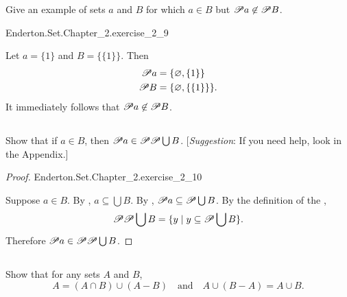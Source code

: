 \documentclass{report}
\begin{document}
Give an example of sets $a$ and $B$ for which $a \in B$ but
  $\mathscr{P}a \not\in \mathscr{P}B$.

\begin{answer}

    {Enderton.Set.Chapter\_2.exercise\_2\_9}

  Let $a = \{1\}$ and $B = \{\{1\}\}$.
  Then
    \begin{align*}
      \mathscr{P}a & = \{\varnothing, \{1\}\} \\
      \mathscr{P}B & = \{\varnothing, \{\{1\}\}\}.
    \end{align*}
  It immediately follows that $\mathscr{P}a \not\in \mathscr{P}B$.

\end{answer}

\subsection{}%

Show that if $a \in B$, then $\mathscr{P}a \in \mathscr{P}\mathscr{P}\bigcup B$.
[\textit{Suggestion}: If you need help, look in the Appendix.]

\begin{proof}

    {Enderton.Set.Chapter\_2.exercise\_2\_10}

  Suppose $a \in B$.
  By , $a \subseteq \bigcup B$.
  By , $\mathscr{P}a \subseteq \mathscr{P}\bigcup B$.
  By the definition of the ,
    $$\mathscr{P}\mathscr{P}\bigcup B =
      \{ y \mid y \subseteq \mathscr{P}\bigcup B \}.$$
  Therefore $\mathscr{P}a \in \mathscr{P}\mathscr{P}\bigcup B$.

\end{proof}

\subsection{}%

Show that for any sets $A$ and $B$,
  $$A = (A \cap B) \cup (A - B) \quad\text{and}\quad
    A \cup (B - A) = A \cup B.$$
\end{document}

